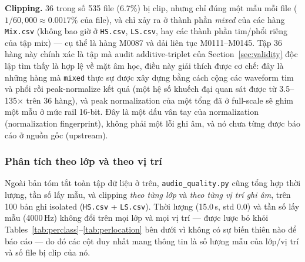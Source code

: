 \documentclass[11pt]{article}
\begin{document}
\textbf{Clipping.} 36 trong số 535 file (6.7\%) bị clip, nhưng chỉ đúng
một mẫu mỗi file ($1/60{,}000 \approx 0.0017\%$ của file), và chỉ xảy ra
ở thành phần \emph{mixed} của các hàng \texttt{Mix.csv} (không bao giờ ở
\texttt{HS.csv}, \texttt{LS.csv}, hay các thành phần tim/phổi riêng của
tập mix) --- cụ thể là hàng M0087 và dải liên tục M0111--M0145. Tập 36
hàng này chính xác là tập mà audit additive-triplet của
Section~\ref{sec:validity} độc lập tìm thấy là hợp lệ về mặt âm học, điều
này giải thích được cơ chế: đây là những hàng mà \texttt{mixed} thực sự
được xây dựng bằng cách cộng các waveform tim và phổi rồi peak-normalize
kết quả (một hệ số khuếch đại quan sát được từ 3.5--135$\times$ trên 36
hàng), và peak normalization của một tổng đã ở full-scale sẽ ghim một mẫu
ở mức rail 16-bit. Đây là một dấu vân tay của normalization (normalization
fingerprint), không phải một lỗi ghi âm, và nó chưa từng được báo cáo ở
nguồn gốc (upstream).

\subsubsection{Phân tích theo lớp và theo vị trí}
\label{sec:perclass}

Ngoài bản tóm tắt toàn tập dữ liệu ở trên, \texttt{audio\_quality.py}
cũng tổng hợp thời lượng, tần số lấy mẫu, và clipping \emph{theo từng
lớp} và \emph{theo từng vị trí ghi âm}, trên 100 bản ghi isolated
(\texttt{HS.csv} + \texttt{LS.csv}). Thời lượng (15.0\,s, std 0.0) và
tần số lấy mẫu (4000\,Hz) không đổi trên mọi lớp và mọi vị trí --- được
lược bỏ khỏi Tables~\ref{tab:perclass}--\ref{tab:perlocation} bên dưới vì
không có
sự biến thiên nào để báo cáo --- do đó các cột duy nhất mang thông tin là
số lượng mẫu của lớp/vị trí và số file bị clip của nó.
\end{document}
